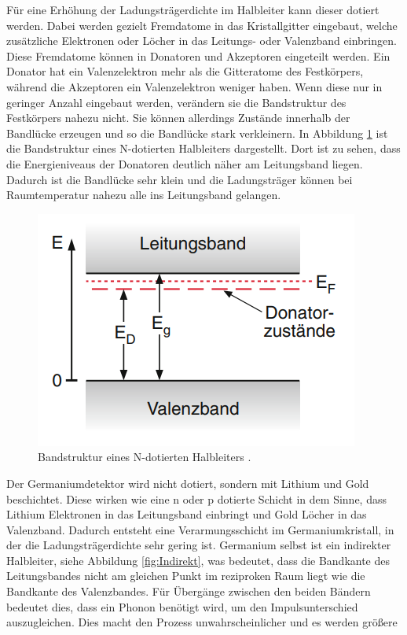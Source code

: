 \noindent Für eine Erhöhung der Ladungsträgerdichte im Halbleiter kann dieser dotiert werden. Dabei werden gezielt Fremdatome in das Kristallgitter eingebaut, welche zusätzliche Elektronen oder Löcher in das Leitungs- oder Valenzband einbringen.
Diese Fremdatome können in Donatoren und Akzeptoren eingeteilt werden. Ein Donator hat ein Valenzelektron mehr als die Gitteratome des Festkörpers, während die Akzeptoren ein Valenzelektron weniger haben.
Wenn diese nur in geringer Anzahl eingebaut werden, verändern sie die Bandstruktur des Festkörpers nahezu nicht. Sie können allerdings Zustände innerhalb der Bandlücke 
erzeugen und so die Bandlücke stark verkleinern. In Abbildung \ref{fig:Ndot} ist 
die Bandstruktur eines N-dotierten Halbleiters dargestellt. Dort ist zu sehen, dass die Energieniveaus der Donatoren deutlich näher am Leitungsband liegen. 
Dadurch ist die Bandlücke sehr klein und die Ladungsträger können bei Raumtemperatur nahezu alle ins Leitungsband gelangen.
\begin{figure}[H]
    \centering
    \includegraphics[scale=0.8]{illustration/Ndot.png}
    \caption{Bandstruktur eines N-dotierten Halbleiters \cite{demtröder}.}
    \label{fig:Ndot}
\end{figure}
\noindent Der Germaniumdetektor wird nicht dotiert, sondern  mit Lithium und Gold beschichtet. Diese wirken wie eine n oder p dotierte Schicht in dem Sinne, dass Lithium 
Elektronen in das Leitungsband einbringt und Gold Löcher in das Valenzband. Dadurch entsteht eine Verarmungsschicht im Germaniumkristall, in der die Ladungsträgerdichte sehr gering ist. 
Germanium selbst ist ein indirekter Halbleiter, siehe Abbildung \ref{fig:Indirekt}, was bedeutet, dass die Bandkante des Leitungsbandes nicht am gleichen Punkt im reziproken Raum liegt wie die Bandkante des Valenzbandes.
Für Übergänge zwischen den beiden Bändern bedeutet dies, dass ein Phonon benötigt wird, um den Impulsunterschied auszugleichen. Dies macht den Prozess unwahrscheinlicher und es werden größere
